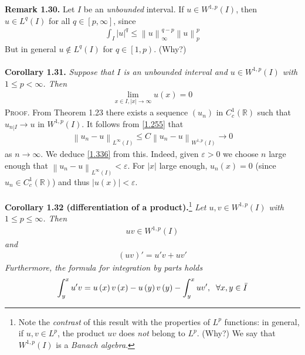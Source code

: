 \documentclass[a4paper,oneside]{book}
\numberwithin{equation}{chapter}
\begin{document}
\textbf{Remark 1.30.} Let $I$ be an \textit{unbounded} interval. If $u\in W^{1,p}\left(I\right)$, then $u\in L^q\left(I\right)$ for all $q\in \left[p,\infty\right]$, since
\begin{align}
\int_I {{{\left| u \right|}^q}}  \le \left\| u \right\|_\infty ^{q - p}\left\| u \right\|_p^p
\end{align}
But in general $u \notin {L^q}\left( I \right)$ for $q \in \left[1,p\right)$. (Why?)\\
\\
\textbf{Corollary 1.31.} \textit{Suppose that $I$ is an unbounded interval and $u\in W^{1,p}\left(I\right)$ with $1\le p<\infty$. Then}
\begin{align}
\label{1.336}
\mathop {\lim }\limits_{x \in I,\left| x \right| \to \infty } u\left( x \right) = 0
\end{align}
\textsc{Proof.} From Theorem 1.23 there exists a sequence $\left(u_n\right)$ in $C_c^1\left(\mathbb{R}\right)$ such that ${u_{\left. n \right|I}} \to u$ in $W^{1,p}\left(I\right)$. It follows from \eqref{1.255} that 
\begin{align}
{\left\| {{u_n} - u} \right\|_{{L^\infty }\left( I \right)}} \le C{\left\| {{u_n} - u} \right\|_{{W^{1,p}}\left( I \right)}} \to 0
\end{align}
as $n \to \infty $. We deduce \eqref{1.336} from this. Indeed, given $\varepsilon >0$ we choose $n$ large enough that ${\left\| {{u_n} - u} \right\|_{{L^\infty }\left( I \right)}} < \varepsilon $. For $\left| x \right|$ large enough, $u_n\left(x\right)=0$ (since $u_n\in C_c^1\left(\mathbb{R}\right)$) and thus $\left| {u\left( x \right)} \right| < \varepsilon $.\\
\\
\textbf{Corollary 1.32 (differentiation of a product).}\footnote{Note the \textit{contrast} of this result with the properties of $L^p$ functions: in general, if $u,v\in L^p$, the product $uv$ does \textit{not} belong to $L^p$. (Why?) We say that $W^{1,p}\left(I\right)$ is a \textit{Banach algebra}.} \textit{Let $u,v\in W^{1,p}\left(I\right)$ with $1\le p\le \infty$. Then} 
\begin{align}
uv \in {W^{1,p}}\left( I \right)
\end{align}
\textit{and}
\begin{align}
\label{1.339}
\left( {uv} \right)' = u'v + uv'
\end{align}
\textit{Furthermore, the formula for integration by parts holds}
\begin{align}	
\label{1.337}
\int_y^x {u'v}  = u\left( x \right)v\left( x \right) - u\left( y \right)v\left( y \right) - \int_y^x {uv'} ,\hspace{0.2cm}\forall x,y \in \bar I
\end{align}
\end{document}
